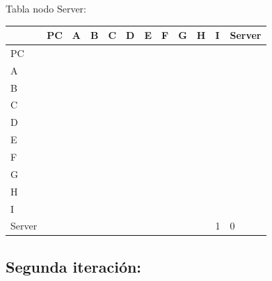 \documentclass[a4paper]{article}
\begin{document}
\begin{table}[ht]
Tabla nodo Server:\\
\begin{tabular}{|l|l|l|l|l|l|l|l|l|l|l|l|}
\hline
       & PC & A & B & C & D & E & F & G & H & I & Server \\ \hline
PC     &    &   &   &   &   &   &   &   &   &   &        \\ \hline
A      &    &   &   &   &   &   &   &   &   &   &        \\ \hline
B      &    &   &   &   &   &   &   &   &   &   &        \\ \hline
C      &    &   &   &   &   &   &   &   &   &   &        \\ \hline
D      &    &   &   &   &   &   &   &   &   &   &        \\ \hline
E      &    &   &   &   &   &   &   &   &   &   &        \\ \hline
F      &    &   &   &   &   &   &   &   &   &   &        \\ \hline
G      &    &   &   &   &   &   &   &   &   &   &        \\ \hline
H      &    &   &   &   &   &   &   &   &   &   &        \\ \hline
I      &    &   &   &   &   &   &   &   &   &   &        \\ \hline
Server &    &   &   &   &   &   &   &   &   & 1 & 0      \\ \hline
\end{tabular}
\end{table}
\clearpage

\subsection{Segunda iteración:}
\end{document}
